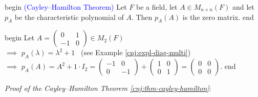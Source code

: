 \documentclass[
  12pt,
  a4paper,
  twoside]{article}
\theoremstyle{plain}
\theoremstyle{definition}
\begin{document}
\csname begin\label{cnj:thm-cayley-hamilton}
\textcolor{blue}{(Cayley--Hamilton Theorem)}
Let \(F\) be a field, let \(A \in M_{n \times n}(F)\) and let \(p_A\) be the characteristic polynomial of \(A\). Then \(p_{A}(A)\) is the zero matrix.
\csname end

\csname begin\label{cnj:expl-cayley-hamilton}
Let \(A = \begin{pmatrix} 0 & 1 \\ -1 & 0 \end{pmatrix} \in M_{2}(F)\)\\
\(\implies\) \(p_{A}(\lambda) = \lambda^{2} + 1\) \hfill~{(see Example \ref{cnj:expl-diag-multi})}\\
\(\implies\) \(p_{A}(A) = A^{2} + 1\cdot I_{2} = \begin{pmatrix} -1 & 0 \\ 0 & -1 \end{pmatrix} + \begin{pmatrix} 1 & 0 \\ 0 & 1 \end{pmatrix} = \begin{pmatrix} 0 & 0 \\ 0 & 0 \end{pmatrix}\).
\csname end

\emph{Proof of the Cayley--Hamilton Theorem \ref{cnj:thm-cayley-hamilton}}:
\end{document}
